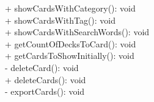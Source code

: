 { 
    + showCardsWithCategory(): void \\ 
    + showCardsWithTag(): void\\
    + showCardsWithSearchWords(): void \\
    + getCountOfDecksToCard(): void\\
    + getCardsToShowInitially(): void\\
    - deleteCard(): void\\
    + deleteCards(): void\\
    - exportCards(): void\\		
}{}